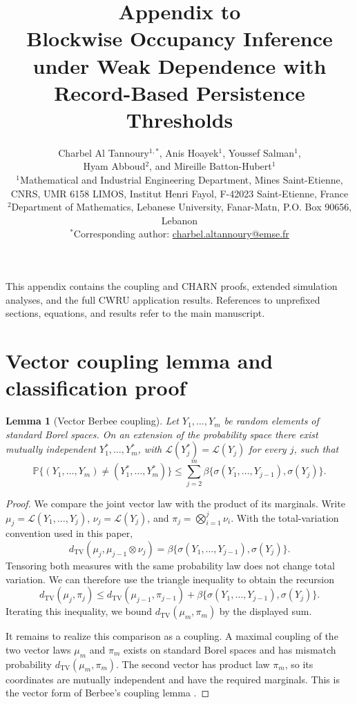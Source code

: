 \documentclass[11pt]{article}
\title{\bfseries Appendix to\\[3pt] Blockwise Occupancy Inference under Weak Dependence with Record-Based Persistence Thresholds}
\author{
Charbel Al Tannoury$^{1,*}$, Anis Hoayek$^{1}$, Youssef Salman$^{1}$,\\
Hyam Abboud$^{2}$, and Mireille Batton-Hubert$^{1}$\\[5pt]
\small $^{1}$Mathematical and Industrial Engineering Department, Mines Saint-Etienne,\\[-2pt]
\small CNRS, UMR 6158 LIMOS, Institut Henri Fayol, F-42023 Saint-Etienne, France\\
\small $^{2}$Department of Mathematics, Lebanese University, Fanar-Matn, P.O. Box 90656, Lebanon\\[3pt]
\small $^*$Corresponding author: \href{mailto:charbel.altannoury@emse.fr}{charbel.altannoury@emse.fr}
}
\date{}
\newtheorem{lemma}[theorem]{Lemma}
\theoremstyle{definition}
\theoremstyle{remark}
\DeclareMathOperator{\TV}{TV}
\newcommand{\Prob}{\mathbb P}
\newcommand{\1}{\mathbf 1}
\newcommand{\cL}{\mathcal L}
\begin{document}
\renewcommand{\thesection}{\Alph{section}}
\renewcommand{\theequation}{A\arabic{equation}}
\renewcommand{\thetable}{A\arabic{table}}
\renewcommand{\thefigure}{A\arabic{figure}}
\renewcommand{\thepage}{A\arabic{page}}
\maketitle
\noindent This appendix contains the coupling and CHARN proofs, extended simulation analyses, and the full CWRU application results. References to unprefixed sections, equations, and results refer to the main manuscript.
\section{Vector coupling lemma and classification proof}\label{app:coupling}

\begin{lemma}[Vector Berbee coupling]\label{lem:vectorberbee}
Let $Y_1,\ldots,Y_m$ be random elements of standard Borel spaces. On an extension of the probability space there exist mutually independent $Y_1^*,\ldots,Y_m^*$, with $\cL(Y_j^*)=\cL(Y_j)$ for every $j$, such that
\[
\Prob\{(Y_1,\ldots,Y_m)\ne(Y_1^*,\ldots,Y_m^*)\}
\le\sum_{j=2}^m
\beta\{\sigma(Y_1,\ldots,Y_{j-1}),\sigma(Y_j)\}.
\]
\end{lemma}

\begin{proof}
We compare the joint vector law with the product of its marginals. Write $\mu_j=\cL(Y_1,\ldots,Y_j)$, $\nu_j=\cL(Y_j)$, and $\pi_j=\bigotimes_{i=1}^j\nu_i$. With the total-variation convention used in this paper,
\[
d_{\TV}(\mu_j,\mu_{j-1}\otimes\nu_j)
=\beta\{\sigma(Y_1,\ldots,Y_{j-1}),\sigma(Y_j)\}.
\]
Tensoring both measures with the same probability law does not change total variation. We can therefore use the triangle inequality to obtain the recursion
\[
d_{\TV}(\mu_j,\pi_j)
\le d_{\TV}(\mu_{j-1},\pi_{j-1})
+\beta\{\sigma(Y_1,\ldots,Y_{j-1}),\sigma(Y_j)\}.
\]
Iterating this inequality, we bound $d_{\TV}(\mu_m,\pi_m)$ by the displayed sum.

It remains to realize this comparison as a coupling. A maximal coupling of the two vector laws $\mu_m$ and $\pi_m$ exists on standard Borel spaces and has mismatch probability $d_{\TV}(\mu_m,\pi_m)$. The second vector has product law $\pi_m$, so its coordinates are mutually independent and have the required marginals. This is the vector form of Berbee's coupling lemma \citep{berbee1979random}.
\end{proof}
\end{document}
